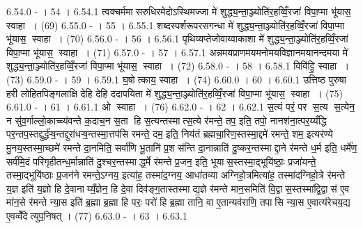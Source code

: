 6.54.0
- । 54 ।
6.54.1
त्वक्चर्ममासरुधिरमेदोऽस्थिमज्जा मे॑ शुद्ध्य॒न्ता॒ञ्ज्योति॑र॒हव्विँ॒रजा॑ विपा॒प्मा भू॑यास॒॒ स्वाहा । (69)
6.55.0
- । 55 ।
6.55.1
शब्दस्पर्शरूपरसगन्धा मे॑ शुद्ध्य॒न्ता॒ञ्ज्योति॑र॒हव्विँ॒रजा॑ विपा॒प्मा भू॑यास॒॒ स्वाहा । (70)
6.56.0
- । 56 ।
6.56.1
पृथिव्यप्तेजोवाय्वाकाशा मे॑ शुद्ध्य॒न्ता॒ञ्ज्योति॑र॒हव्विँ॒रजा॑ विपा॒प्मा भू॑यास॒॒ स्वाहा । (71)
6.57.0
- । 57 ।
6.57.1
अन्नमयप्राणमयमनोमयविज्ञानमयानन्दमया मे॑ शुद्ध्य॒न्ता॒ञ्ज्योति॑र॒हव्विँ॒रजा॑ विपा॒प्मा भू॑यास॒॒ स्वाहा । (72)
6.58.0
- । 58 ।
6.58.1
विवि॑ट्टि॒ स्वाहा । (73)
6.59.0
- । 59 ।
6.59.1
घ॒षोत्काय॒ स्वाहा । (74)
6.60.0
। 60 ।
6.60.1
उत्तिष्ठ पुरुषा हरी लोहितपिङ्गलाक्षि देहि देहि ददापयिता मे॑ शुद्ध्य॒न्ता॒ञ्ज्योति॑र॒हव्विँ॒रजा॑ विपा॒प्मा भू॑यास॒॒ स्वाहा । (75)
6.61.0
- । 61 ।
6.61.1
ओ स्वाहा । (76)
6.62.0
- । 62 ।
6.62.1
स॒त्यं परं॒ पर॑ स॒त्य स॒त्येन॒ न सु॑व॒र्गाल्लो॒काच्च्य॑वन्ते क॒दाच॒न स॒ता हि स॒त्यन्तस्मात्स॒त्ये र॑मन्ते॒ तप॒ इति॒ तपो॒ नानश॑ना॒त्पर॒य्यँद्धि पर॒न्तप॒स्तद्दुर्द्ध॑ऱ्ष॒न्तद्दुरा॑धऱ्ष॒न्तस्मा॒त्तप॑सि रमन्ते॒ दम॒ इति॒ निय॑तं ब्रह्मचा॒रिण॒स्तस्मा॒द्दमे॑ रमन्ते॒ शम॒ इत्यर॑ण्ये मु॒नय॒स्तस्मा॒च्छमे॑ रमन्ते दा॒नमिति॒ सर्वा॑णि भू॒तानि॑ प्र॒शस॑न्ति दा॒नान्नाति॑ दु॒ष्कर॒न्तस्माद्दा॒ने र॑मन्ते ध॒र्म इति॒ धर्मे॑ण॒ सर्व॑मि॒दं परि॑गृहीतन्ध॒र्मान्नाति॑ दु॒श्चर॒न्तस्माद्ध॒र्मे र॑मन्ते प्र॒जन॒ इति॒ भूया॑स॒स्तस्मा॒द्भूयि॑ष्ठाः॒ प्रजा॑यन्ते॒ तस्मा॒द्भूयि॑ष्ठाः प्र॒जन॑ने रमन्ते॒ऽग्नय॒ इत्या॑ह॒ तस्मा॑द॒ग्नय॒ आधा॑तव्या अग्निहो॒त्रमित्या॑ह॒ तस्मा॑दग्निहो॒त्रे र॑मन्ते य॒ज्ञ इति॑ य॒ज्ञो हि दे॒वानाय्यँ॒ज्ञेन॒ हि दे॒वा दिव॑ङ्ग॒तास्तस्माद्य॒ज्ञे र॑मन्ते मान॒समिति॑ वि॒द्वास॒स्तस्मा॑द्वि॒द्वास॑ ए॒व मा॑न॒से र॑मन्ते न्या॒स इति॑ ब्र॒ह्मा ब्र॒ह्मा हि परः॒ परो॑ हि ब्र॒ह्मा तानि॒ वा ए॒तान्यव॑राणि॒ तपा॑सि न्या॒स ए॒वात्य॑रेचय॒द्य ए॒वव्वेँदेत्युप॒निषत् । (77)
6.63.0
- । 63 ।
6.63.1
